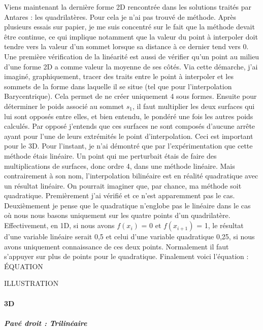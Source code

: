 Viens maintenant la dernière forme 2D rencontrée dans les solutions traités par Antares : les quadrilatères. Pour cela je n'ai pas trouvé de méthode. Après plusieurs essais sur papier, je me suis concentré sur le fait que la méthode devait être continue, ce qui implique notamment que la valeur du point à interpoler doit tendre vers la valeur d'un sommet lorsque sa distance à ce dernier tend vers 0. Une première vérification de la linéarité est aussi de vérifier qu'un point au milieu d'une forme 2D a comme valeur la moyenne de ses côtés.
Via cette démarche, j'ai imaginé, graphiquement, tracer des traits entre le point à interpoler et les sommets de la forme dans laquelle il se situe (tel que pour l'interpolation Barycentrique). Cela permet de ne créer uniquement 4 sous formes. Ensuite pour déterminer le poids associé au sommet \( s_1 \), il faut multiplier les deux surfaces qui lui sont opposés entre elles, et bien entendu, le pondéré une fois les autres poids calculés. Par opposé j'entends que ces surfaces ne sont composés d'aucune arrête ayant pour l'une de leurs extrémités le point d'interpolation. Ceci est important pour le 3D. Pour l'instant, je n'ai démontré que par l'expérimentation que cette méthode étais linéaire. Un point qui me perturbait étais de faire des multiplications de surfaces, donc ordre 4, dans une méthode linéaire. Mais contrairement à son nom, l'interpolation bilinéaire est en réalité quadratique avec un résultat linéaire. On pourrait imaginer que, par chance, ma méthode soit quadratique. Premièrement j'ai vérifié et ce n'est apparemment pas le cas. Deuxièmement je pense que le quadratique n'englobe pas le linéaire dans le cas où nous nous basons uniquement sur les quatre points d'un quadrilatère. Effectivement, en 1D, si nous avons \(f(x_i)\) = 0 et \(f(x_{i+1})\) = 1, le résultat d'une variable linéaire serait 0,5 et celui d'une variable quadratique 0,25, si nous avons uniquement connaissance de ces deux points. Normalement il faut s'appuyer sur plus de points pour le quadratique. Finalement voici l'équation :\\
ÉQUATION

ILLUSTRATION\vspace{0.5cm}  %


\paragraph{3D}
\subparagraph{Pavé droit : Trilinéaire}

